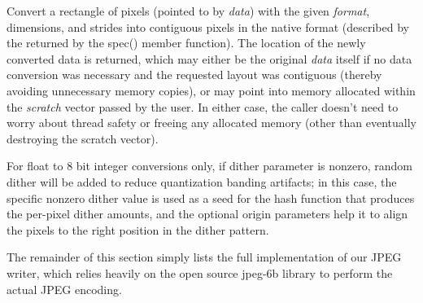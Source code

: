 \apiend


Convert a rectangle of pixels (pointed to by \emph{data}) with the given
\emph{format}, dimensions, and strides into contiguous pixels in the
native format (described by the \ImageSpec returned by the {\cf spec()}
member function).  The location of the newly converted data is returned,
which may either be the original \emph{data} itself if no data
conversion was necessary and the requested layout was contiguous
(thereby avoiding unnecessary memory copies), or may point into memory
allocated within the \emph{scratch} vector passed by the user.  In
either case, the caller doesn't need to worry about thread safety or
freeing any allocated memory (other than eventually destroying the
scratch vector).

\apiend

For {\cf float} to 8 bit integer conversions only, if {\cf dither} parameter
is nonzero, random dither will be added to reduce quantization banding
artifacts; in this case, the specific nonzero {\cf dither} value is used as
a seed for the hash function that produces the per-pixel dither amounts, and
the optional {\cf origin} parameters help it to align the pixels to the
right position in the dither pattern.


\bigskip
\bigskip

\noindent
The remainder of this section simply lists the full implementation of
our JPEG writer, which relies heavily on the open source {\fn jpeg-6b}
library to perform the actual JPEG encoding.



